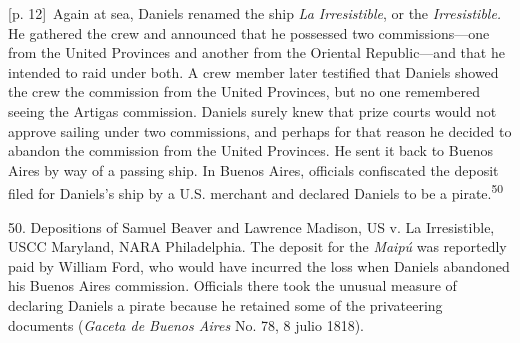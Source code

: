 \documentclass[10pt,a4paper]{article}
\begin{document}
{\scriptsize\color{gray} [p. 12]}\ Again at sea, Daniels renamed the ship \textit{La Irresistible}, or the \textit{Irresistible.} He gathered the crew and announced that he possessed two commissions—one from the United Provinces and another from the Oriental Republic—and that he intended to raid under both. A crew member later testified that Daniels showed the crew the commission from the United Provinces, but no one remembered seeing the Artigas commission. Daniels surely knew that prize courts would not approve sailing under two commissions, and perhaps for that reason he decided to abandon the commission from the United Provinces. He sent it back to Buenos Aires by way of a passing ship. In Buenos Aires, officials confiscated the deposit filed for Daniels’s ship by a U.S. merchant and declared Daniels to be a pirate.\nobreak\textsuperscript{50}\par{\small 50. Depositions of Samuel Beaver and Lawrence Madison, US v. La Irresistible, USCC Maryland, NARA Philadelphia. The deposit for the \textit{Maipú} was reportedly paid by William Ford, who would have incurred the loss when Daniels abandoned his Buenos Aires commission. Officials there took the unusual measure of declaring Daniels a pirate because he retained some of the privateering documents (\textit{Gaceta de Buenos Aires} No. 78, 8 julio 1818).\par}
\end{document}

